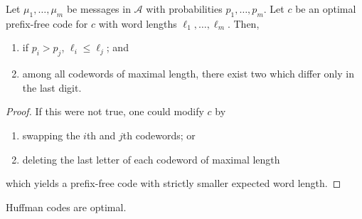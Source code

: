 \begin{lemma}
    Let $\mu_1, \dots, \mu_m$ be messages in $\mathcal A$ with probabilities $p_1, \dots, p_m$.
    Let $c$ be an optimal prefix-free code for $c$ with word lengths $\ell_1, \dots, \ell_m$.
    Then,
    \begin{enumerate}
        \item if $p_i > p_j$, $\ell_i \leq \ell_j$; and
        \item among all codewords of maximal length, there exist two which differ only in the last digit.
    \end{enumerate}
\end{lemma}

\begin{proof}
    If this were not true, one could modify $c$ by
    \begin{enumerate}
        \item swapping the $i$th and $j$th codewords; or
        \item deleting the last letter of each codeword of maximal length
    \end{enumerate}
    which yields a prefix-free code with strictly smaller expected word length.
\end{proof}

\begin{theorem}[Huffman 1952]
    Huffman codes are optimal.
\end{theorem}


